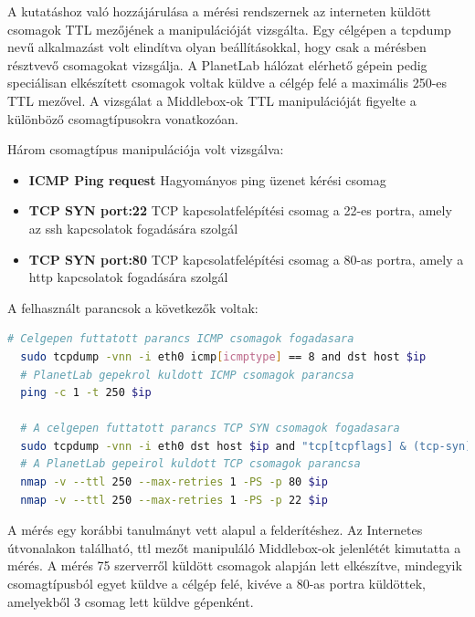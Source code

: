 A kutatáshoz való hozzájárulása a mérési rendszernek az interneten küldött csomagok TTL mezőjének a manipulációját vizsgálta. Egy célgépen a tcpdump nevű alkalmazást volt elindítva olyan beállításokkal, hogy csak a mérésben résztvevő csomagokat vizsgálja. A PlanetLab hálózat elérhető gépein pedig speciálisan elkészített csomagok voltak küldve a célgép felé a maximális 250-es TTL mezővel. A vizsgálat a Middlebox-ok TTL manipulációját figyelte a különböző csomagtípusokra vonatkozóan.

Három csomagtípus manipulációja volt vizsgálva:

\begin{itemize}
\item \textbf{ICMP Ping request} Hagyományos ping üzenet kérési csomag
\item \textbf{TCP SYN port:22} TCP kapcsolatfelépítési csomag a 22-es portra, amely az ssh kapcsolatok fogadására szolgál
\item \textbf{TCP SYN port:80} TCP kapcsolatfelépítési csomag a 80-as portra, amely a http kapcsolatok fogadására szolgál
\end{itemize}

A felhasznált parancsok a következők voltak:

\begin{lstlisting}[language=bash]
  # Celgepen futtatott parancs ICMP csomagok fogadasara
  sudo tcpdump -vnn -i eth0 icmp[icmptype] == 8 and dst host $ip
  # PlanetLab gepekrol kuldott ICMP csomagok parancsa
  ping -c 1 -t 250 $ip
  
  # A celgepen futtatott parancs TCP SYN csomagok fogadasara
  sudo tcpdump -vnn -i eth0 dst host $ip and "tcp[tcpflags] & (tcp-syn) != 0"
  # A PlanetLab gepeirol kuldott TCP csomagok parancsa
  nmap -v --ttl 250 --max-retries 1 -PS -p 80 $ip
  nmap -v --ttl 250 --max-retries 1 -PS -p 22 $ip
\end{lstlisting}


A mérés egy korábbi tanulmányt\cite{middlebox} vett alapul a felderítéshez. Az Internetes útvonalakon található, ttl mezőt manipuláló Middlebox-ok jelenlétét kimutatta a mérés. A mérés 75 szerverről küldött csomagok alapján lett elkészítve, mindegyik csomagtípusból egyet küldve a célgép felé, kivéve a 80-as portra küldöttek, amelyekből 3 csomag lett küldve gépenként.


